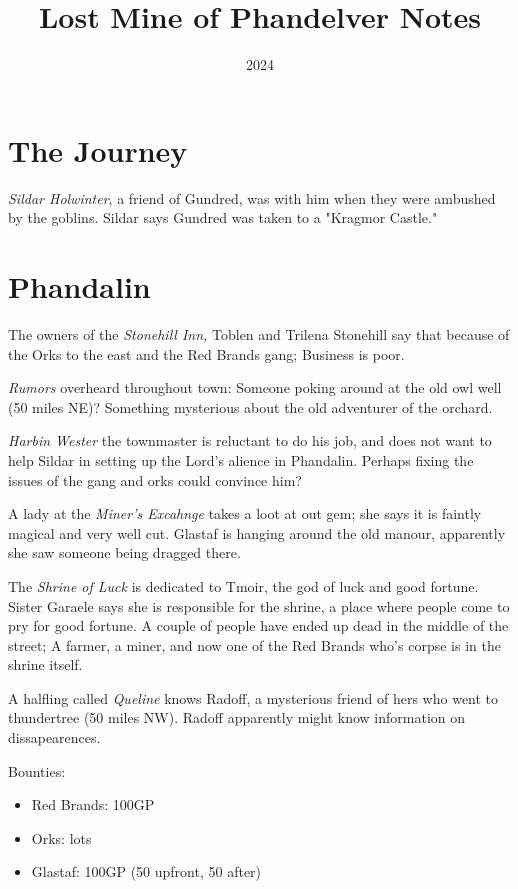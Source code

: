 \documentclass{article}
\title{Lost Mine of Phandelver Notes}
\date{2024}
\begin{document}
\maketitle
\section{The Journey}\emph{Sildar Holwinter}, a friend of Gundred, was with him when they were ambushed by the goblins. Sildar says Gundred was taken to a "Kragmor Castle."
\section{Phandalin}
The owners of the \emph{Stonehill Inn,} Toblen and Trilena Stonehill say that because of the Orks to the east and the Red Brands gang; Business is poor.

\emph{Rumors} overheard throughout town:
Someone poking around at the old owl well (50 miles NE)?
Something mysterious about the old adventurer of the orchard.

\emph{Harbin Wester} the townmaster is reluctant to do his job, and does not want to help Sildar in setting up the Lord's alience in Phandalin. Perhaps fixing the issues of the gang and orks could convince him?

A lady at the \emph{Miner's Excahnge} takes a loot at out gem; she says it is faintly magical and very well cut. Glastaf is hanging around the old manour, apparently she saw someone being dragged there.

The \emph{Shrine of Luck} is dedicated to Tmoir, the god of luck and good fortune. Sister Garaele says she is responsible for the shrine, a place where people come to pry for good fortune. A couple of people have ended up dead in the middle of the street; A farmer, a miner, and now one of the Red Brands who's corpse is in the shrine itself.

A halfling called \emph{Queline} knows Radoff, a mysterious friend of hers who went to thundertree (50 miles NW). Radoff apparently might know information on dissapearences.

Bounties:
\begin{itemize}
	\item Red Brands: 100GP
	\item Orks: lots
	\item Glastaf: 100GP (50 upfront, 50 after)
\end{itemize}
\end{document}
